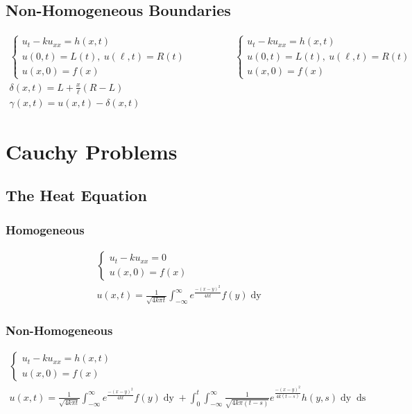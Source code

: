 \subsection{Non-Homogeneous Boundaries}
\begin{gather*}
\begin{cases}
u_{t} - ku_{xx} = h(x,t)\\
u(0,t) = L(t),\ u(\ell,t) = R(t)\\
u(x,0) = f(x)
\end{cases}
\hspace{2cm}
\begin{cases}
u_{t} - ku_{xx} = h(x,t)\\
u(0,t) = L(t),\ u(\ell,t) = R(t)\\
u(x,0) = f(x)
\end{cases}\\
\delta(x,t) = L + \frac{x}{\ell}(R - L)\\
\gamma(x,t) = u(x,t) - \delta(x,t)
\end{gather*}



\newpage
\section*{Cauchy Problems}
\subsection{The Heat Equation}
\subsubsection*{Homogeneous}
\begin{gather*}
\begin{cases}
u_{t} - k u_{xx} = 0\\
u(x,0) = f(x)
\end{cases}\\
u(x,t) = \frac{1}{\sqrt{4k\pi t}}\int_{-\infty}^{\infty}e^{\frac{-(x-y)^{2}}{4kt}}f(y)\mathop{dy}
\end{gather*}
\subsubsection*{Non-Homogeneous}
\begin{gather*}
\begin{cases}
u_{t} - k u_{xx} = h(x,t)\\
u(x,0) = f(x)
\end{cases}\\
u(x,t) = \frac{1}{\sqrt{4k\pi t}}\int_{-\infty}^{\infty}e^{\frac{-(x-y)^{2}}{4kt}}f(y)\mathop{dy} +
\int_{0}^{t}\int_{-\infty}^{\infty}\frac{1}{\sqrt{4k\pi(t-s)}}e^{\frac{-(x-y)^{2}}{4k(t
-s)}}h(y,s)\mathop{dy}\mathop{ds}
\end{gather*}
